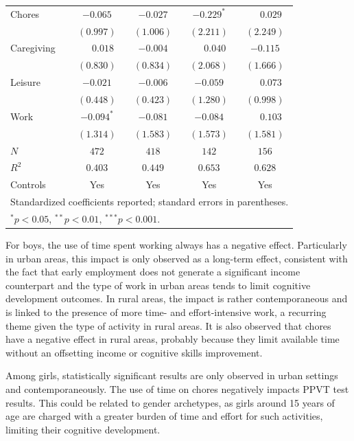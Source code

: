 \documentclass[12pt]{article}
\begin{document}
\begin{table}[ht]
\begin{tabular}{lcccc}
\quad Chores
  & $-0.065$       & $-0.027$      & $-0.229^{*}$  & $\phantom{-}0.029$ \\
  & $(0.997)$      & $(1.006)$     & $(2.211)$     & $(2.249)$ \\
\quad Caregiving
  & $\phantom{-}0.018$ & $-0.004$  & $\phantom{-}0.040$ & $-0.115$ \\
  & $(0.830)$      & $(0.834)$     & $(2.068)$     & $(1.666)$ \\
\quad Leisure
  & $-0.021$       & $-0.006$      & $-0.059$      & $\phantom{-}0.073$ \\
  & $(0.448)$      & $(0.423)$     & $(1.280)$     & $(0.998)$ \\
\quad Work
  & $-0.094^{*}$   & $-0.081$      & $-0.084$      & $\phantom{-}0.103$ \\
  & $(1.314)$      & $(1.583)$     & $(1.573)$     & $(1.581)$ \\
\addlinespace
$N$  & $472$  & $418$  & $142$  & $156$ \\
$R^2$ & $0.403$ & $0.449$ & $0.653$ & $0.628$ \\
Controls & Yes & Yes & Yes & Yes \\
\bottomrule
\multicolumn{5}{l}{\footnotesize Standardized coefficients reported; standard
errors in parentheses.} \\
\multicolumn{5}{l}{\footnotesize $^{*}p<0.05$, $^{**}p<0.01$,
$^{***}p<0.001$.}
\end{tabular}
\end{table}

For boys, the use of time spent working always has a negative effect.
Particularly in urban areas, this impact is only observed as a long-term
effect, consistent with the fact that early employment does not generate a
significant income counterpart and the type of work in urban areas tends to
limit cognitive development outcomes. In rural areas, the impact is rather
contemporaneous and is linked to the presence of more time- and effort-intensive
work, a recurring theme given the type of activity in rural areas. It is also
observed that chores have a negative effect in rural areas, probably because
they limit available time without an offsetting income or cognitive skills
improvement.

Among girls, statistically significant results are only observed in urban
settings and contemporaneously. The use of time on chores negatively impacts
PPVT test results. This could be related to gender archetypes, as girls around
15 years of age are charged with a greater burden of time and effort for such
activities, limiting their cognitive development.
\end{document}
